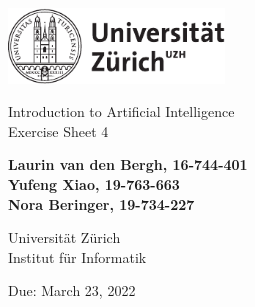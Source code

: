 \documentclass[12pt]{article}
\begin{document}
\begin{titlepage}
\includegraphics[height=20mm]{images/uzh_logo}\\

\begin{flushleft}

\vspace{2cm}

{\Large Introduction to Artificial Intelligence\\Exercise Sheet 4}\\

\vspace{4cm}

\textbf{Laurin van den Bergh, 16-744-401\\Yufeng Xiao, 19-763-663\\Nora Beringer, 19-734-227}\\

\vspace{2cm}

Universität Zürich\\
Institut für Informatik

\vfill Due: March 23, 2022

\vspace{3cm}


\end{flushleft}
\end{titlepage}

\newpage
\end{document}
